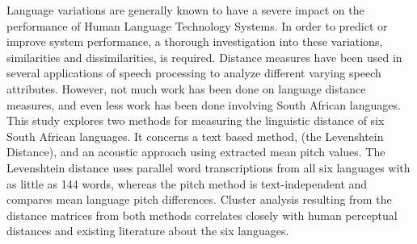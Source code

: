 Language variations are generally known to have a severe impact on the performance of Human Language Technology Systems. In order to predict or
 improve system performance, a thorough investigation into these variations,
 similarities and dissimilarities, is required. Distance measures have been used
 in several applications of speech processing to analyze different varying
 speech attributes. However, not much work has been done on language distance
 measures, and even less work has been done involving South African languages.
 This study explores two methods for measuring the linguistic distance of six
 South African languages. It concerns a text based method, (the Levenshtein
 Distance), and an acoustic approach using extracted mean pitch values. The
 Levenshtein distance uses parallel word transcriptions from all six languages
 with as little as 144 words, whereas the pitch method is text-independent and
 compares mean language pitch differences. Cluster analysis resulting from the
 distance matrices from both methods correlates closely with human perceptual
 distances and existing literature about the six languages.

